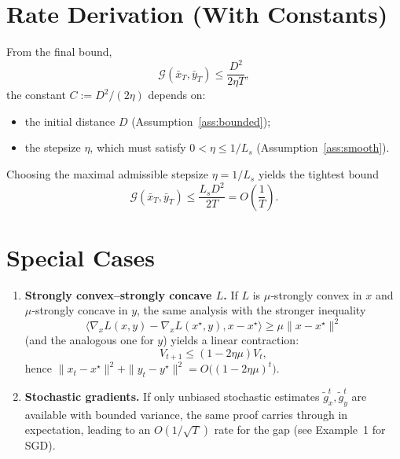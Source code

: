 \documentclass[11pt]{article}
\newcommand{\gap}{\mathcal{G}}
\begin{document}
\section*{Rate Derivation (With Constants)}
From the final bound,
\[
\gap(\bar{x}_{T},\bar{y}_{T})\le \frac{D^{2}}{2\eta T},
\]
the constant $C:=D^{2}/(2\eta)$ depends on:
\begin{itemize}
\item the initial distance $D$ (Assumption~\ref{ass:bounded});
\item the stepsize $\eta$, which must satisfy $0<\eta\le 1/L_{s}$ (Assumption~\ref{ass:smooth}).
\end{itemize}
Choosing the maximal admissible stepsize $\eta=1/L_{s}$ yields the tightest bound
\[
\gap(\bar{x}_{T},\bar{y}_{T})\le \frac{L_{s}D^{2}}{2T}=O\!\left(\frac{1}{T}\right).
\]

\section*{Special Cases}
\begin{enumerate}[label=\alph*.]
\item \textbf{Strongly convex–strongly concave $L$.} If $L$ is $\mu$‑strongly convex in $x$ and $\mu$‑strongly concave in $y$, the same analysis with the stronger inequality
\[
\langle \nabla_{x}L(x,y)-\nabla_{x}L(x^{\star},y),x-x^{\star}\rangle\ge \mu\|x-x^{\star}\|^{2}
\]
(and the analogous one for $y$) yields a linear contraction:
\[
V_{t+1}\le (1-2\eta\mu)V_{t},
\]
hence $\|x_{t}-x^{\star}\|^{2}+\|y_{t}-y^{\star}\|^{2}=O\bigl((1-2\eta\mu)^{t}\bigr)$.
\item \textbf{Stochastic gradients.} If only unbiased stochastic estimates $\tilde{g}_{x}^{t},\tilde{g}_{y}^{t}$ are available with bounded variance, the same proof carries through in expectation, leading to an $O(1/\sqrt{T})$ rate for the gap (see Example~1 for SGD).
\end{enumerate}
\end{document}
